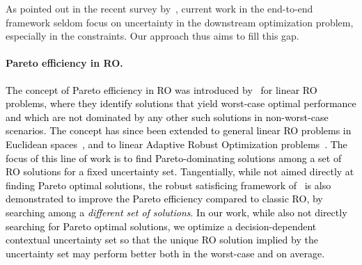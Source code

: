 \documentclass[11pt]{article}
\newcommand{\RC}[1]{\textcolor{black}{#1}}
\begin{document}
As pointed out in the recent survey by~\cite{contex}, current work in the end-to-end framework seldom focus on uncertainty in the downstream optimization problem, especially in the constraints.
Our approach thus aims to fill this gap.

\paragraph{Pareto efficiency in \gls{RO}.}
\RC{The concept of Pareto efficiency in \gls{RO} was introduced by~\cite{pareto} for linear \gls{RO} problems, where they identify solutions that yield worst-case optimal performance and which are not dominated by any other such solutions in non-worst-case scenarios. The concept has since been extended to general linear \gls{RO} problems in Euclidean spaces~\citep{pareto3}, and to linear Adaptive Robust Optimization problems~\citep{pareto1}. 
The focus of this line of work is to find Pareto-dominating solutions among a set of \gls{RO} solutions for a fixed uncertainty set.
Tangentially, while not aimed directly at finding Pareto optimal solutions, the robust satisficing framework of~\cite{long2023robust} is also demonstrated to improve the Pareto efficiency compared to classic \gls{RO}, by searching among a {\it different set of solutions}. 
In our work, while also not directly searching for Pareto optimal solutions, we optimize a decision-dependent contextual uncertainty set so that the unique \gls{RO} solution implied by the uncertainty set may perform better both in the worst-case and on average.} 
\end{document}
